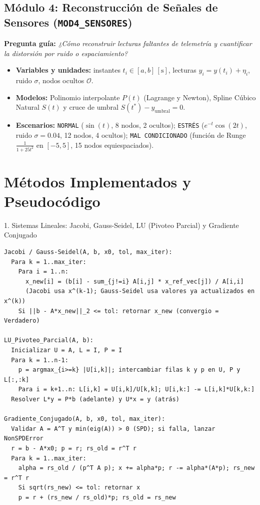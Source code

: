 \documentclass[11pt,a4paper]{article}
\begin{document}
\subsection{Módulo 4: Reconstrucción de Señales de Sensores (\texttt{MOD4\_SENSORES})}
\textbf{Pregunta guía:} \textit{¿Cómo reconstruir lecturas faltantes de telemetría y cuantificar la distorsión por ruido o espaciamiento?}
\begin{itemize}[noitemsep]
    \item \textbf{Variables y unidades:} instantes $t_i\in[a,b]\,[\text{s}]$, lecturas $y_i=y(t_i)+\eta_i$, ruido $\sigma$, nodos ocultos $\mathcal{O}$.
    \item \textbf{Modelos:} Polinomio interpolante $P(t)$ (Lagrange y Newton), Spline Cúbico Natural $S(t)$ y cruce de umbral $S(t^*)-y_{\text{umbral}}=0$.
    \item \textbf{Escenarios:} \texttt{NORMAL} ($\sin(t)$, 8 nodos, 2 ocultos); \texttt{ESTRÉS} ($e^{-t}\cos(2t)$, ruido $\sigma=0.04$, 12 nodos, 4 ocultos); \texttt{MAL CONDICIONADO} (función de Runge $\frac{1}{1+25t^2}$ en $[-5,5]$, 15 nodos equiespaciados).
\end{itemize}

\section{Métodos Implementados y Pseudocódigo}

\begin{pseudo}{1. Sistemas Lineales: Jacobi, Gauss-Seidel, LU (Pivoteo Parcial) y Gradiente Conjugado}
\begin{verbatim}
Jacobi / Gauss-Seidel(A, b, x0, tol, max_iter):
  Para k = 1..max_iter:
    Para i = 1..n:
      x_new[i] = (b[i] - sum_{j!=i} A[i,j] * x_ref_vec[j]) / A[i,i]
      (Jacobi usa x^(k-1); Gauss-Seidel usa valores ya actualizados en x^(k))
    Si ||b - A*x_new||_2 <= tol: retornar x_new (convergio = Verdadero)

LU_Pivoteo_Parcial(A, b):
  Inicializar U = A, L = I, P = I
  Para k = 1..n-1:
    p = argmax_{i>=k} |U[i,k]|; intercambiar filas k y p en U, P y L[:,:k]
    Para i = k+1..n: L[i,k] = U[i,k]/U[k,k]; U[i,k:] -= L[i,k]*U[k,k:]
  Resolver L*y = P*b (adelante) y U*x = y (atrás)

Gradiente_Conjugado(A, b, x0, tol, max_iter):
  Validar A = A^T y min(eig(A)) > 0 (SPD); si falla, lanzar NonSPDError
  r = b - A*x0; p = r; rs_old = r^T r
  Para k = 1..max_iter:
    alpha = rs_old / (p^T A p); x += alpha*p; r -= alpha*(A*p); rs_new = r^T r
    Si sqrt(rs_new) <= tol: retornar x
    p = r + (rs_new / rs_old)*p; rs_old = rs_new
\end{verbatim}
\end{pseudo}
\end{document}
